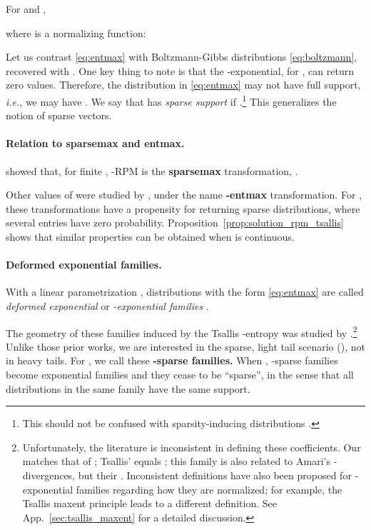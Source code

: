 \documentclass{article}
\newcommand{\remove}[1]{}
\begin{document}
\vspace{0.15cm}
\begin{proposition}\label{prop:solution_rpm_tsallis}
For  and , 

where 
 is a normalizing function:

\end{proposition}

Let us contrast \eqref{eq:entmax} with Boltzmann-Gibbs distributions \eqref{eq:boltzmann}, recovered with . One key thing to note is that the -exponential, for , can return zero values. Therefore, the distribution  in \eqref{eq:entmax} may not have full support, \textit{i.e.}, we may have .  
We say that  has {\it sparse support} if .\footnote{This should not be confused with sparsity-inducing distributions \citep{FigueiredoNIPS2001,TippingJMLR2001}.} This generalizes the notion of sparse vectors.
 

\paragraph{Relation to sparsemax and entmax.} 
\citet{blondel2020learning}  showed that, for finite ,  -RPM is the {\bf sparsemax} transformation, . 
\remove{(Euclidean projection of   onto the -dimensional probability simplex ).} 
Other values of  were studied by \citet{peters2019sparse}, under the name {\bf -entmax} transformation. For , these transformations have a propensity for returning sparse distributions, where several entries have zero probability. 
Proposition~\ref{prop:solution_rpm_tsallis} shows that similar properties can be obtained when  is continuous. 


\paragraph{Deformed exponential families.} 
With a linear parametrization , 
distributions with the form \eqref{eq:entmax} are called \textit{deformed exponential} or \textit{-exponential families} \citep{naudts2009q,sears2010generalized,ding2010t,matsuzoe2012geometry}. 
\remove{
also referred to as a \textit{-exponential family} \citep{ding2010t} and a \textit{-exponential family} \citep{matsuzoe2012geometry}. 
}
The geometry of these families induced by the Tsallis -entropy was studied by \citet[\S 4.3]{amari2016information}.\footnote{Unfortunately, the literature is inconsistent in defining these coefficients. Our  matches that of \citet{blondel2020learning}; Tsallis'  equals ; this family is also related to Amari's -divergences, but their . Inconsistent definitions have also been proposed for -exponential families regarding how they are normalized; for example, the Tsallis maxent principle leads to a different definition. See App.~\ref{sec:tsallis_maxent} for a detailed discussion.} 
Unlike those prior works, we are interested in the sparse, light tail scenario (), not in heavy tails. For , we call these {\bf -sparse families.} 
When , -sparse families become exponential families and they cease to be ``sparse'', in the sense that all distributions in the same family have the same support.
\end{document}
